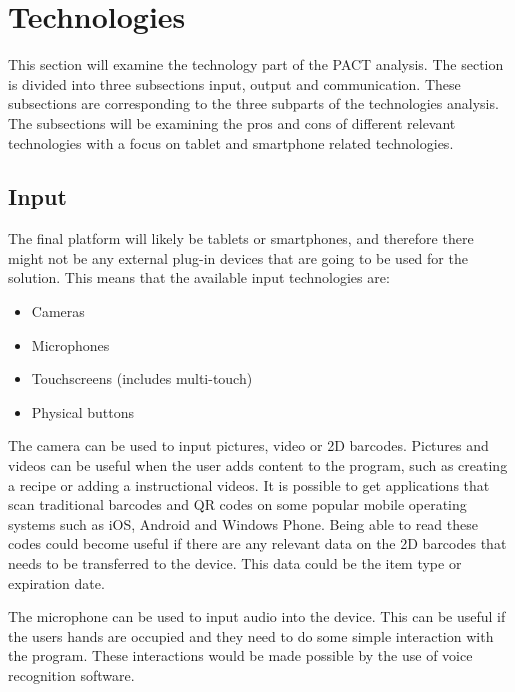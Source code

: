 \section{Technologies}
This section will examine the technology part of the PACT analysis. The section is divided into three subsections input, output and communication. These subsections are corresponding to the three subparts of the technologies analysis. The subsections will be examining the pros and cons of different relevant technologies with a focus on tablet and smartphone related technologies.

\subsection{Input}
The final platform will likely be tablets or smartphones, and therefore there might not be any external plug-in devices that are going to be used for the solution. This means that the available input technologies are:

\begin{itemize}
    \item Cameras
    \item Microphones
    \item Touchscreens (includes multi-touch)
    \item Physical buttons
\end{itemize}

The camera can be used to input pictures, video or 2D barcodes. Pictures and videos can be useful when the user adds content to the program, such as creating a recipe or adding a instructional videos. It is possible to get applications that scan traditional barcodes and QR codes on some popular mobile operating systems such as iOS, Android and Windows Phone\cite{barcode_Phones}. Being able to read these codes could become useful if there are any relevant data on the 2D barcodes that needs to be transferred to the device. This data could be the item type or expiration date\cite{barcodeInc_FAQ}.           
    
The microphone can be used to input audio into the device. This can be useful if the users hands are occupied and they need to do some simple interaction with the program. These interactions would be made possible by the use of voice recognition software.
%

